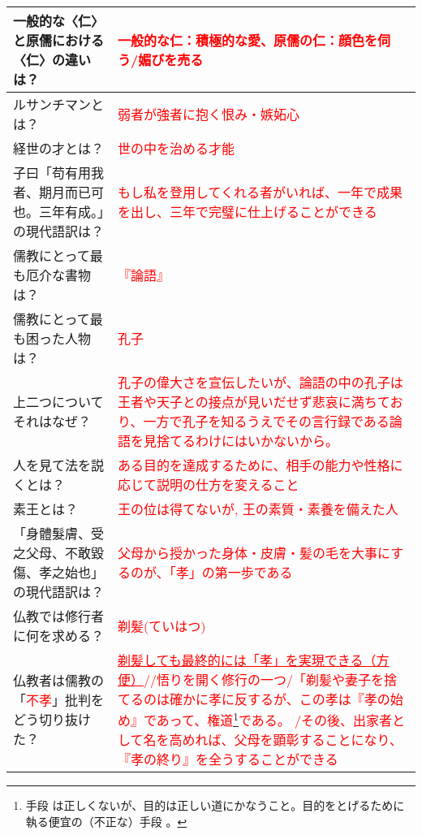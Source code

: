 \documentclass[a4paper,10pt]{article}
\begin{document}
\begin{longtable}{|p{}|p{}|}
一般的な〈仁〉と原儒における〈仁〉の違いは？ & \textcolor{red}{一般的な仁：積極的な愛、原儒の仁：顔色を伺う/媚びを売る} \\ \hline
ルサンチマンとは？ & \textcolor{red}{弱者が強者に抱く恨み・嫉妬心} \\ \hline
経世の才とは？ & \textcolor{red}{世の中を治める才能} \\ \hline
子曰「苟有用我者、期月而已可也。三年有成。」の現代語訳は？ & \textcolor{red}{もし私を登用してくれる者がいれば、一年で成果を出し、三年で完璧に仕上げることができる} \\ \hline
儒教にとって最も厄介な書物は？ & \textcolor{red}{『論語』} \\ \hline
儒教にとって最も困った人物は？ & \textcolor{red}{孔子} \\ \hline
上二つについて それはなぜ？ & \textcolor{red}{孔子の偉大さを宣伝したいが、論語の中の孔子は王者や天子との接点が見いだせず悲哀に満ちており、一方で孔子を知るうえでその言行録である論語を見捨てるわけにはいかないから。}\\ \hline
人を見て法を説くとは？ & \textcolor{red}{ある目的を達成するために、相手の能力や性格に応じて説明の仕方を変えること} \\ \hline
素王とは？ & \textcolor{red}{王の位は得てないが, 王の素質・素養を備えた人} \\ \hline
「身體髮膚、受之父母、不敢毀傷、孝之始也」の現代語訳は？ & \textcolor{red}{父母から授かった身体・皮膚・髪の毛を大事にするのが、「孝」の第一歩である} \\ \hline
仏教では修行者に何を求める？ & \textcolor{red}{剃髪(ていはつ)} \\ \hline
仏教者は儒教の「\textcolor{red}{不孝}」批判をどう切り抜けた？ & \textcolor{red}{\underline{剃髪しても最終的には「孝」を実現できる（方便）}//悟りを開く修行の一つ/「剃髪や妻子を捨てるのは確かに孝に反するが、この孝は『孝の始め』であって、権道\footnote{手段 は正しくないが、目的は正しい道にかなうこと。目的をとげるために執る便宜の（不正な）手段 。}である。
/その後、出家者として名を高めれば、父母を顕彰することになり、『孝の終り』を全うすることができる} \\ \hline
\end{longtable}
\end{document}
